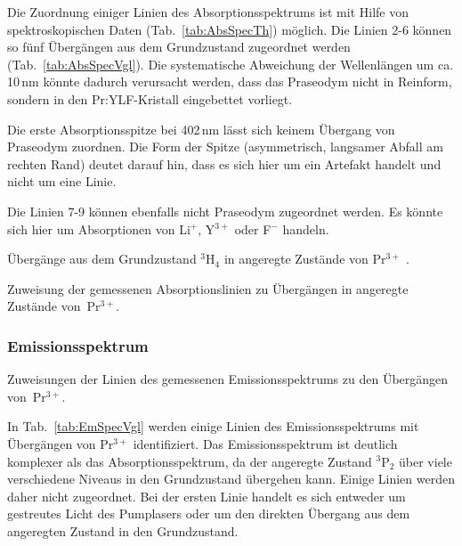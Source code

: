 Die Zuordnung einiger Linien des Absorptionsspektrums ist mit Hilfe von spektroskopischen Daten
(Tab.~\ref{tab:AbsSpecTh}) möglich.
Die Linien 2-6 können so fünf Übergängen aus dem Grundzustand zugeordnet werden
(Tab.~\ref{tab:AbsSpecVgl}).
Die systematische Abweichung der Wellenlängen um ca. 10\,nm könnte dadurch verursacht werden,
dass das Praseodym nicht in Reinform, sondern in den Pr:YLF-Kristall eingebettet vorliegt.

Die erste Absorptionsspitze bei 402\,nm lässt sich keinem Übergang von Praseodym zuordnen.
Die Form der Spitze (asymmetrisch, langsamer Abfall am rechten Rand) deutet darauf hin,
dass es sich hier um ein Artefakt handelt und nicht um eine Linie.

Die Linien 7-9 können ebenfalls nicht Praseodym zugeordnet werden.
Es könnte sich hier um Absorptionen von Li$^+$, Y$^{3+}$ oder F$^-$ handeln.


\begin{table}[htb]
\caption{Übergänge aus dem Grundzustand $^3$H$_4$ in angeregte Zustände von Pr$^{3+}$
\cite{NIST_ASD}.}

\label{tab:AbsSpecTh}
\end{table}

\begin{table}[htb]
\caption{Zuweisung der gemessenen Absorptionslinien zu Übergängen in angeregte Zustände
von~Pr$^{3+}$.}

\label{tab:AbsSpecVgl}
\end{table}

\FloatBarrier

\subsubsection{Emissionsspektrum}

\begin{table}[htb]
\caption{Zuweisungen der Linien des gemessenen Emissionsspektrums zu den Übergängen von~Pr$^{3+}$.}

\label{tab:EmSpecVgl}
\end{table}

In Tab.~\ref{tab:EmSpecVgl} werden einige Linien des Emissionsspektrums mit Übergängen von Pr$^{3+}$
identifiziert.
Das Emissionsspektrum ist deutlich komplexer als das Absorptionsspektrum,
da der angeregte Zustand $^3$P$_2$ über viele verschiedene Niveaus in den Grundzustand übergehen
kann.
Einige Linien werden daher nicht zugeordnet.
Bei der ersten Linie handelt es sich entweder um gestreutes Licht des Pumplasers oder um den
direkten Übergang aus dem angeregten Zustand in den Grundzustand.


